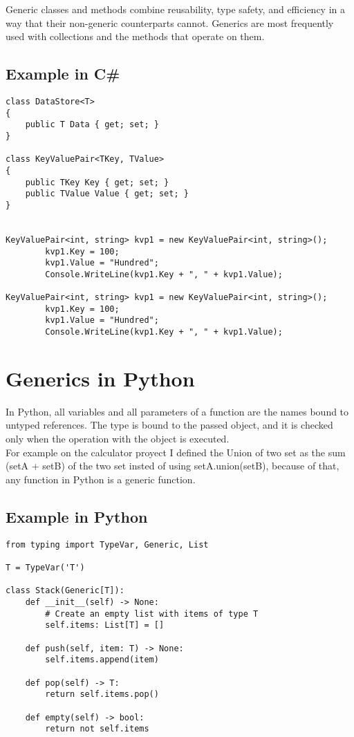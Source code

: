 \documentclass[
	12pt, %
]{fphw}
\begin{document}
Generic classes and methods combine reusability, type safety, and efficiency in a way that their non-generic counterparts cannot. Generics are most frequently used with collections and the methods that operate on them.

\subsection*{Example in C\#}

\begin{verbatim}
class DataStore<T>
{
    public T Data { get; set; }
}

class KeyValuePair<TKey, TValue>
{
    public TKey Key { get; set; }
    public TValue Value { get; set; }
}


KeyValuePair<int, string> kvp1 = new KeyValuePair<int, string>();
		kvp1.Key = 100;
		kvp1.Value = "Hundred";
		Console.WriteLine(kvp1.Key + ", " + kvp1.Value);

KeyValuePair<int, string> kvp1 = new KeyValuePair<int, string>();
		kvp1.Key = 100;
		kvp1.Value = "Hundred";
		Console.WriteLine(kvp1.Key + ", " + kvp1.Value);
\end{verbatim}

\newpage
\section*{{\color{RoyalPurple}Generics in Python}}

In Python, all variables and all parameters of a function are the names bound to untyped references. The type is bound to the passed object, and it is checked only when the operation with the object is executed.\\

For example on the calculator proyect I defined the Union of two set as the sum (setA + setB) of the two set insted of using setA.union(setB), because of that, any function in Python is a generic function.

\subsection*{Example in Python}

\begin{verbatim}
from typing import TypeVar, Generic, List

T = TypeVar('T')

class Stack(Generic[T]):
    def __init__(self) -> None:
        # Create an empty list with items of type T
        self.items: List[T] = []

    def push(self, item: T) -> None:
        self.items.append(item)

    def pop(self) -> T:
        return self.items.pop()

    def empty(self) -> bool:
        return not self.items
\end{verbatim}
\end{document}
